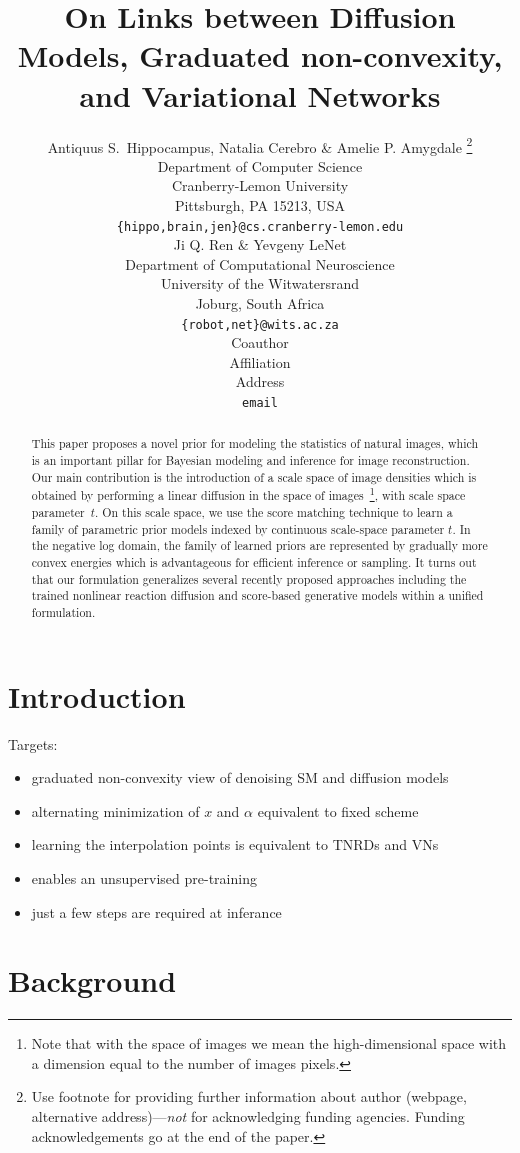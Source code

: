\documentclass{article} %
\title{On Links between Diffusion Models, Graduated non-convexity, and Variational Networks}
\author{Antiquus S.~Hippocampus, Natalia Cerebro \& Amelie P. Amygdale \thanks{ Use footnote for providing further information
about author (webpage, alternative address)---\emph{not} for acknowledging
funding agencies.  Funding acknowledgements go at the end of the paper.} \\
Department of Computer Science\\
Cranberry-Lemon University\\
Pittsburgh, PA 15213, USA \\
\texttt{\{hippo,brain,jen\}@cs.cranberry-lemon.edu} \\
\And
Ji Q. Ren \& Yevgeny LeNet \\
Department of Computational Neuroscience \\
University of the Witwatersrand \\
Joburg, South Africa \\
\texttt{\{robot,net\}@wits.ac.za} \\
\AND
Coauthor \\
Affiliation \\
Address \\
\texttt{email}
}
\theoremstyle{plain}
\theoremstyle{definition}
\theoremstyle{remark}
\begin{document}
\maketitle

\begin{abstract}
This paper proposes a novel prior for modeling the statistics of natural images, which is an important pillar for Bayesian modeling and inference for image reconstruction. 
Our main contribution is the introduction of a scale space of image densities which is obtained by performing a linear diffusion in the space of images~\footnote{Note that with the space of images we mean the high-dimensional space with a dimension equal to the number of images pixels.}, with scale space parameter~$t$. On this scale space, we use the score matching technique to learn a family of parametric prior models indexed by continuous scale-space parameter $t$. In the negative log domain, the family of learned priors are represented by gradually more convex energies which is advantageous for efficient inference or sampling. It turns out that our formulation generalizes several recently proposed approaches including the trained nonlinear reaction diffusion and score-based generative models within a unified formulation.
\end{abstract}

\section{Introduction}

Targets:
\begin{itemize}
    \item graduated non-convexity view of denoising SM and diffusion models
    \item alternating minimization of $x$ and $\alpha$ equivalent to fixed scheme
    \item learning the interpolation points is equivalent to TNRDs and VNs
    \item enables an unsupervised pre-training
    \item just a few steps are required at inferance
\end{itemize}

\section{Background}
\end{document}
